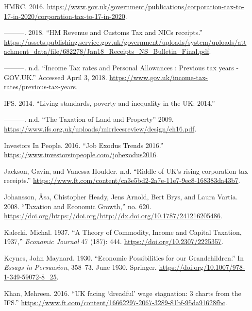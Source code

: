 \documentclass[]{tufte-handout}
\begin{document}
\leavevmode\hypertarget{ref-HMRC2015}{}%
HMRC. 2016.
\url{https://www.gov.uk/government/publications/corporation-tax-to-17-in-2020/corporation-tax-to-17-in-2020}.

\leavevmode\hypertarget{ref-HMRC2018a}{}%
---------. 2018. ``HM Revenue and Customs Tax and NICs receipts.''
\url{https://assets.publishing.service.gov.uk/government/uploads/system/uploads/attachment_data/file/682278/Jan18_Receipts_NS_Bulletin_Final.pdf}.

\leavevmode\hypertarget{ref-HMRC}{}%
---------. n.d. ``Income Tax rates and Personal Allowances : Previous
tax years - GOV.UK.'' Accessed April 3, 2018.
\url{https://www.gov.uk/income-tax-rates/previous-tax-years}.

\leavevmode\hypertarget{ref-IFS2014}{}%
IFS. 2014. ``Living standards, poverty and inequality in the UK: 2014.''

\leavevmode\hypertarget{ref-IFS}{}%
---------. n.d. ``The Taxation of Land and Property'' 2009.
\url{https://www.ifs.org.uk/uploads/mirrleesreview/design/ch16.pdf}.

\leavevmode\hypertarget{ref-InvestorsinPeopleHQ2016}{}%
Investors In People. 2016. ``Job Exodus Trends 2016.''
\url{https://www.investorsinpeople.com/jobexodus2016}.

\leavevmode\hypertarget{ref-JacksonHoulder}{}%
Jackson, Gavin, and Vanessa Houlder. n.d. ``Riddle of UK's rising
corporation tax receipts.''
\url{https://www.ft.com/content/ca3e5bd2-2a7e-11e7-9ec8-168383da43b7}.

\leavevmode\hypertarget{ref-Johansson2008}{}%
Johansson, Åsa, Chistopher Heady, Jens Arnold, Bert Brys, and Laura
Vartia. 2008. ``Taxation and Economic Growth,'' no. 620.
\url{https://doi.org/https://doi.org/http://dx.doi.org/10.1787/241216205486}.

\leavevmode\hypertarget{ref-Kalecki1937}{}%
Kalecki, Michal. 1937. ``A Theory of Commodity, Income and Capital
Taxation, 1937,'' \emph{Economic Journal} 47 (187): 444.
\url{https://doi.org/10.2307/2225357}.

\leavevmode\hypertarget{ref-Keynes1930}{}%
Keynes, John Maynard. 1930. ``Economic Possibilities for our
Grandchildren.'' In \emph{Essays in Persuasion}, 358--73. June 1930.
Springer. \url{https://doi.org/10.1007/978-1-349-59072-8_25}.

\leavevmode\hypertarget{ref-Khan2016}{}%
Khan, Mehreen. 2016. ``UK facing `dreadful' wage stagnation: 3 charts
from the IFS.''
\url{https://www.ft.com/content/16662297-2067-3289-81bf-95da91628fbc}.
\end{document}

